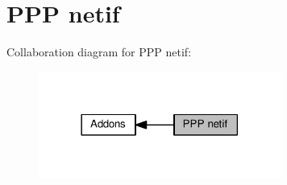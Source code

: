 \hypertarget{group__ppp}{}\section{P\+PP netif}
\label{group__ppp}
Collaboration diagram for P\+PP netif\+:
\nopagebreak
\begin{figure}[H]
\begin{center}
\leavevmode
\includegraphics[width=225pt]{group__ppp}
\end{center}
\end{figure}

\begin{DoxyVerbInclude}
\end{DoxyVerbInclude}
 